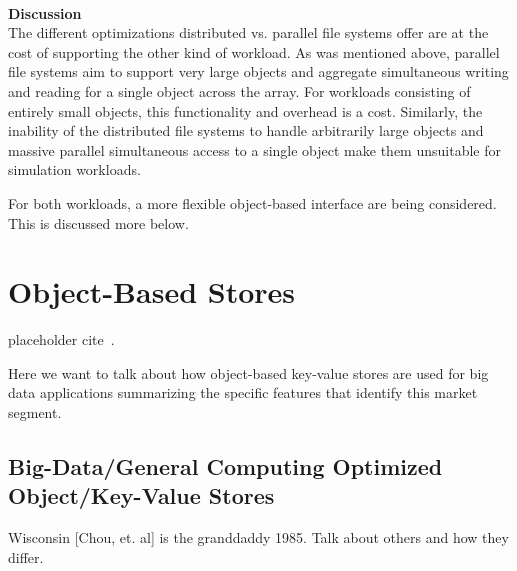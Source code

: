 ~\\
\noindent\textbf{Discussion}\\
The different optimizations distributed vs. parallel file systems offer are at
the cost of supporting the other kind of workload. As was mentioned above,
parallel file systems aim to support very large objects and aggregate
simultaneous writing and reading for a single object across the array. For
workloads consisting of entirely small objects, this functionality and overhead
is a cost. Similarly, the inability of the distributed file systems to handle
arbitrarily large objects and massive parallel simultaneous access to a single
object make them unsuitable for simulation workloads.

For both workloads, a more flexible object-based interface are being
considered. This is discussed more below.

\section{Object-Based Stores}\label{sec:intro}
placeholder cite~\cite{ilyas2004hsn}.

Here we want to talk about how object-based key-value stores are used for big
data applications summarizing the specific features that identify this market
segment.

\subsection{Big-Data/General Computing Optimized Object/Key-Value Stores}

Wisconsin [Chou, et. al] is the granddaddy 1985. Talk about others and how they differ.


